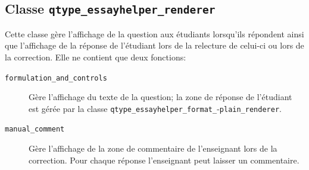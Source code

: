 \subsection*{Classe \texttt{qtype\_essayhelper\_renderer}}
Cette classe g\`ere l'affichage de la question aux \'etudiants lorsqu'ils r\'epondent ainsi que l'affichage de la r\'eponse de l'\'etudiant lors de la relecture de celui-ci ou lors de la correction.
Elle ne contient que deux fonctions:
\begin{description}
  \item[\texttt{formulation\_and\_controls}] G\`ere l'affichage du texte de la question; la zone de r\'eponse de l'\'etudiant est g\'er\'ee par la classe \texttt{qtype\_essayhelper\_format\_}-\texttt{plain\_renderer}.
  \item[\texttt{manual\_comment}] G\`ere l'affichage de la zone de commentaire de l'enseignant lors de la correction. Pour chaque r\'eponse l'enseignant peut laisser un commentaire.
\end{description}
